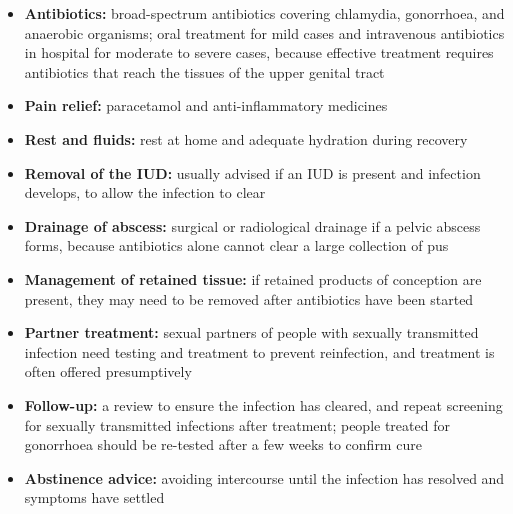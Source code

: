 \begin{itemize}
    \item \textbf{Antibiotics:} broad-spectrum antibiotics covering chlamydia, gonorrhoea, and anaerobic organisms; oral treatment for mild cases and intravenous antibiotics in hospital for moderate to severe cases, because effective treatment requires antibiotics that reach the tissues of the upper genital tract
    \item \textbf{Pain relief:} paracetamol and anti-inflammatory medicines
    \item \textbf{Rest and fluids:} rest at home and adequate hydration during recovery
    \item \textbf{Removal of the IUD:} usually advised if an IUD is present and infection develops, to allow the infection to clear
    \item \textbf{Drainage of abscess:} surgical or radiological drainage if a pelvic abscess forms, because antibiotics alone cannot clear a large collection of pus
    \item \textbf{Management of retained tissue:} if retained products of conception are present, they may need to be removed after antibiotics have been started
    \item \textbf{Partner treatment:} sexual partners of people with sexually transmitted infection need testing and treatment to prevent reinfection, and treatment is often offered presumptively
    \item \textbf{Follow-up:} a review to ensure the infection has cleared, and repeat screening for sexually transmitted infections after treatment; people treated for gonorrhoea should be re-tested after a few weeks to confirm cure
    \item \textbf{Abstinence advice:} avoiding intercourse until the infection has resolved and symptoms have settled
\end{itemize}


